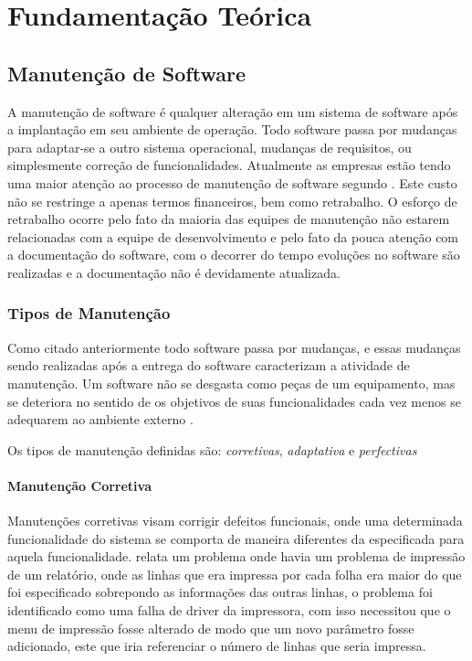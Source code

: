 \chapter{Fundamentação Teórica}\label{fundamentacao}

\section{Manutenção de Software}\label{manutencao}
A manutenção de software é qualquer alteração em um sistema de software após a implantação em seu ambiente de operação. Todo software passa por mudanças para adaptar-se a outro sistema operacional, mudanças de requisitos, ou simplesmente correção de funcionalidades. Atualmente as empresas estão tendo uma maior atenção ao processo de manutenção de software segundo . Este custo não se restringe a apenas termos financeiros, bem como retrabalho. O esforço de retrabalho ocorre pelo fato da maioria das equipes de manutenção não estarem relacionadas com a equipe de desenvolvimento e pelo fato da pouca atenção com a documentação do software, com o decorrer do tempo evoluções no software são realizadas e a documentação não é devidamente atualizada.
\subsection{Tipos de Manutenção}
Como citado anteriormente todo software passa por mudanças, e essas mudanças sendo realizadas após a entrega do software caracterizam a atividade de manutenção. Um software não se desgasta como peças de um equipamento, mas se deteriora no sentido de os objetivos de suas funcionalidades cada vez menos se adequarem ao ambiente externo \cite[p.~33]{matheus2007}.

Os tipos de manutenção definidas são: \textit{corretivas}, \textit{adaptativa} e \textit{perfectivas} 
\subsubsection{Manutenção Corretiva}
Manutenções corretivas visam corrigir defeitos funcionais, onde uma determinada funcionalidade do sistema se comporta de maneira diferentes da especificada para aquela funcionalidade.
 relata um problema onde havia um problema de impressão de um relatório, onde as linhas que era impressa por cada folha era maior do que foi especificado sobrepondo as informações das outras linhas, o problema foi identificado como uma falha de driver da impressora, com isso necessitou que o menu de impressão fosse alterado de modo que um novo parâmetro fosse adicionado, este que iria referenciar o número de linhas que seria impressa.
